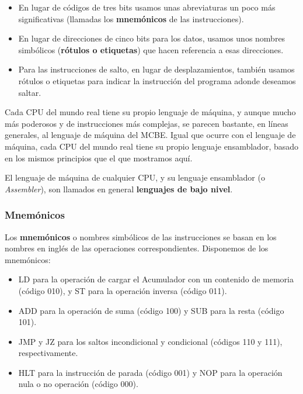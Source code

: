 \documentclass[spanish,A4,]{article}
\begin{document}
\begin{itemize}
\itemsep1pt\parskip0pt
\item
  En lugar de códigos de tres bits usamos unas abreviaturas un poco más
  significativas (llamadas los \textbf{mnemónicos} de las
  instrucciones).
\item
  En lugar de direcciones de cinco bits para los datos, usamos unos
  nombres simbólicos (\textbf{rótulos o etiquetas}) que hacen referencia
  a esas direcciones.
\item
  Para las instrucciones de salto, en lugar de desplazamientos, también
  usamos rótulos o etiquetas para indicar la instrucción del programa
  adonde deseamos saltar.
\end{itemize}

Cada CPU del mundo real tiene su propio lenguaje de máquina, y aunque
mucho más poderosos y de instrucciones más complejas, se parecen
bastante, en líneas generales, al lenguaje de máquina del MCBE. Igual
que ocurre con el lenguaje de máquina, cada CPU del mundo real tiene su
propio lenguaje ensamblador, basado en los mismos principios que el que
mostramos aquí.

El lenguaje de máquina de cualquier CPU, y su lenguaje ensamblador (o
\emph{Assembler}), son llamados en general \textbf{lenguajes de bajo
nivel}.

\subsubsection{Mnemónicos}\label{mnemuxf3nicos}

Los \textbf{mnemónicos} o nombres simbólicos de las instrucciones se
basan en los nombres en inglés de las operaciones correspondientes.
Disponemos de los mnemónicos:

\begin{itemize}
\itemsep1pt\parskip0pt
\item
  LD para la operación de cargar el Acumulador con un contenido de
  memoria (código 010), y ST para la operación inversa (código 011).
\item
  ADD para la operación de suma (código 100) y SUB para la resta (código
  101).
\item
  JMP y JZ para los saltos incondicional y condicional (códigos 110 y
  111), respectivamente.
\item
  HLT para la instrucción de parada (código 001) y NOP para la operación
  nula o no operación (código 000).
\end{itemize}
\end{document}
